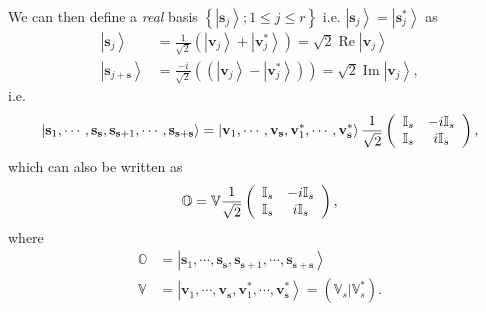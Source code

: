 \documentclass[aps,preprint]{revtex4}%
\begin{document}
We can then define a \emph{real} basis $\left\{  \left\vert \mathbf{s}%
_{j}\right\rangle ;1\leq j\leq r\right\}  $ i.e. $\left\vert \mathbf{s}%
_{j}\right\rangle =\left\vert \mathbf{s}_{j}^{\ast}\right\rangle $ as
\begin{align}
\left\vert \mathbf{s}_{j}\right\rangle  &  =\frac{1}{\sqrt{2}}\left(
\left\vert \mathbf{v}_{j}\right\rangle +\left\vert \mathbf{v}_{j}^{\ast
}\right\rangle \right)  =\sqrt{2}\operatorname{Re}\left\vert \mathbf{v}%
_{j}\right\rangle \nonumber\\
\left\vert \mathbf{s}_{j+\mathbf{s}}\right\rangle  &  =\frac{-i}{\sqrt{2}%
}\left(  \left(  \left\vert \mathbf{v}_{j}\right\rangle -\left\vert
\mathbf{v}_{j}^{\ast}\right\rangle \right)  \right)  =\sqrt{2}%
\operatorname{Im}\left\vert \mathbf{v}_{j}\right\rangle ,
\end{align}
i.e.
\begin{equation}
\left\vert \mathbf{s}_{1},\cdots,\mathbf{s}_{\mathbf{s}},\mathbf{s}%
_{\mathbf{s}+1},\cdots,\mathbf{s}_{\mathbf{s}+\mathbf{s}}\right\rangle
=\left\vert \mathbf{v}_{1},\cdots,\mathbf{v}_{\mathbf{s}},\mathbf{v}_{1}%
^{\ast},\cdots,\mathbf{v}_{\mathbf{s}}^{\ast}\right\rangle \frac{1}{\sqrt{2}%
}\left(
\begin{array}
[c]{cc}%
\mathbb{I}_{s} & -i\mathbb{I}_{s}\\
\mathbb{I}_{s} & i\mathbb{I}_{s}%
\end{array}
\right)  ,
\end{equation}
which can also be written as
\begin{equation}
\mathbb{O}=\mathbb{V}\frac{1}{\sqrt{2}}\left(
\begin{array}
[c]{cc}%
\mathbb{I}_{s} & -i\mathbb{I}_{s}\\
\mathbb{I}_{s} & i\mathbb{I}_{s}%
\end{array}
\right)  ,
\end{equation}
where
\begin{align}
\mathbb{O}  &  =\left\vert \mathbf{s}_{1},\cdots,\mathbf{s}_{\mathbf{s}%
},\mathbf{s}_{\mathbf{s}+1},\cdots,\mathbf{s}_{\mathbf{s}+\mathbf{s}%
}\right\rangle \\
\mathbb{V}  &  =\left\vert \mathbf{v}_{1},\cdots,\mathbf{v}_{\mathbf{s}%
},\mathbf{v}_{1}^{\ast},\cdots,\mathbf{v}_{\mathbf{s}}^{\ast}\right\rangle
=\left(  \left.  \mathbb{V}_{s}\right\vert \mathbb{V}_{s}^{\ast}\right)  .
\end{align}
\end{document}
